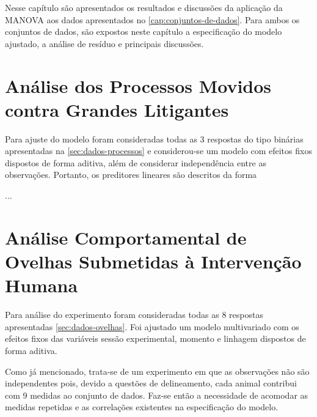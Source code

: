 
Nesse capítulo são apresentados os resultados e discussões da aplicação
da MANOVA aos dados apresentados no \autoref{cap:conjuntos-de-dados}.
Para ambos os conjuntos de dados, são expostos neste capítulo a
especificação do modelo ajustado, a análise de resíduo e principais
discussões.

\section{Análise dos Processos Movidos contra Grandes Litigantes}

Para ajuste do modelo foram consideradas todas as 3 respostas do tipo
binárias apresentadas na \autoref{sec:dados-processos} e considerou-se
um modelo com efeitos fixos dispostos de forma aditiva, além de
considerar independência entre as observações. Portanto, os preditores
lineares são descritos da forma

...

\begin{knitrout}
\color{fgcolor}\begin{kframe}


{\ttfamily\noindent\bfseries{}}\end{kframe}
\end{knitrout}

\section{Análise Comportamental de Ovelhas Submetidas à Intervenção
Humana}

Para análise do experimento foram consideradas todas as 8 respostas apresentadas \autoref{sec:dados-ovelhas}. Foi ajustado um modelo
multivariado com os efeitos fixos das variáveis sessão experimental, 
momento e linhagem dispostos de forma aditiva. 

Como já mencionado, trata-se de um experimento em que as observações não 
são independentes pois, devido a questões de delineamento, cada animal 
contribui com 9 medidas ao conjunto de dados. Faz-se então a necessidade 
de acomodar as medidas repetidas e as correlações existentes na
especificação do modelo. 

